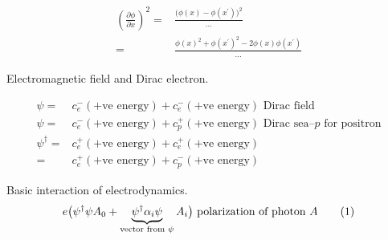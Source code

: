 \documentclass[]{article}
\newcommand\numberthis{\addtocounter{equation}{1}\tag{\theequation}}
\begin{document}
\begin{align*}
(\frac{\partial \phi}{\partial x})^2 =& \frac{\big( \phi(x) - \phi(x^\prime)\big)^2}{...}\\
=& \frac{\phi(x)^2 + \phi(x^\prime)^2 - 2  \phi(x) \phi(x^\prime)}{...}
\end{align*}

Electromagnetic field and Dirac electron.

\begin{align*}
	\psi =& c_e^-(\text{+ve energy}) + c_e^-(\text{+ve energy}) \text{ Dirac field}\\
	\psi =& c_e^-(\text{+ve energy}) + c_p^+(\text{+ve energy}) \text { Dirac sea--$p$ for positron}\\
	\psi^\dagger =& c_e^+(\text{+ve energy}) + c_e^+(\text{+ve energy})\\
	=& c_e^+(\text{+ve energy}) + c_p^-(\text{+ve energy})
\end{align*}

Basic interaction of electrodynamics.
\begin{align*}
	e \big( \psi^\dagger \psi A_0 + 	\underbrace{\psi^\dagger \alpha_i  \psi}_\text{vector from $\psi$} A_i \big) \text{ polarization of photon $A$} \numberthis \label{eq:basic:interaction}
\end{align*}
\end{document}
